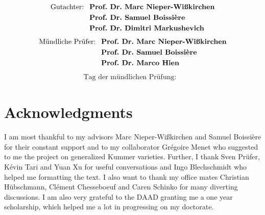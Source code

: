 \documentclass[11pt,twoside]{article}
\begin{document}
\begin{center}
\ \\
\vspace{2cm}
\begin{align*}
\text{Gutachter: }\ 
& \textbf{Prof.~Dr.~Marc Nieper-Wi\ss kirchen}\\\vspace{-1cm}
& \textbf{Prof.~Dr.~Samuel Boissi\`ere} \\
& \textbf{Prof.~Dr.~Dimitri Markushevich} 
\end{align*}
\vspace{2cm}
\begin{align*}
\text{M\"undliche Pr\"ufer: }\ 
& \textbf{Prof.~Dr.~Marc Nieper-Wi\ss kirchen}\\\vspace{-1cm}
& \textbf{Prof.~Dr.~Samuel Boissi\`ere} \\
& \textbf{Prof.~Dr.~Marco Hien} 
\end{align*}
\begin{align*}
\text{Tag der m\"undlichen Pr\"ufung:} &
\end{align*}
\end{center}
\cleardoublepage





\section*{Acknowledgments}
I am most thankful to my advisors Marc Nieper-Wi\ss\-kir\-chen and Samuel Boissi\`ere for their constant support
and to my collaborator Gr\'egoire Menet who suggested to me the project on generalized Kummer varieties.
Further, I thank Sven Pr\"ufer, K\'evin Tari and Yuan Xu for useful conversations and
Ingo Blechschmidt who helped me formatting the text.
I also want to thank my office mates Christian H\"ubschmann, Cl\'ement Chesseboeuf and Caren Schinko for many diverting discussions.
I am also very grateful to the DAAD granting me a one year scholarship, which helped me a lot in progressing on my doctorate. 
\end{document}

